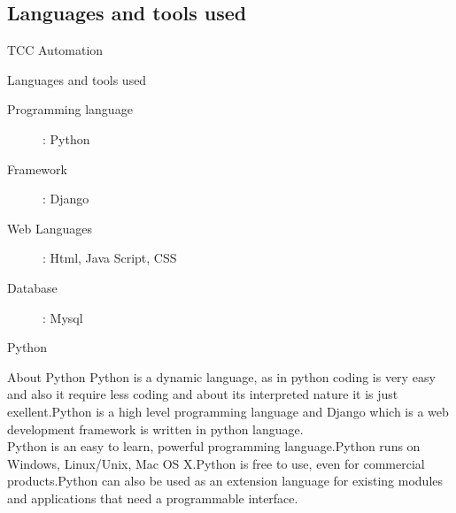 \subsection{Languages and tools used}
\begin{frame}{TCC Automation}
\begin{block}{Languages and tools used}
\begin{description}
\item[Programming language] : Python
\item[Framework] : Django
\item[Web Languages] : Html, Java Script, CSS
\item[Database] : Mysql
\end{description}
\end{block}
\end{frame}
\newpage
\begin{frame}{Python}
\begin{block}{About Python}
 Python is a dynamic language, as in python coding is very easy and also it require less coding and about its interpreted nature it is just exellent.Python is a high level programming language and Django which is a web development framework is written in python language.\\
Python is an easy to learn, powerful programming language.Python runs on Windows, Linux/Unix, Mac OS X.Python is free to use, even for commercial products.Python can also be used as an extension language for existing modules and applications that need a programmable interface.\\
\end{block}
\end{frame}
\newpage

